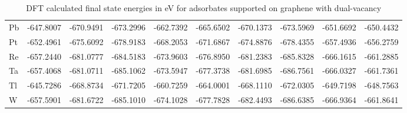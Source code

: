 \begin{table}[h]
{\begin{tabular}{*{10}{l}}
    Pb & -647.8007 & -670.9491 & -673.2996 & -662.7392 & -665.6502 & -670.1373 & -673.5969 & -651.6692 & -650.4432 \\
    Pt & -652.4961 & -675.6092 & -678.9183 & -668.2053 & -671.6867 & -674.8876 & -678.4355 & -657.4936 & -656.2759 \\
    Re & -657.2440 & -681.0777 & -684.5183 & -673.9603 & -676.8950 & -681.2383 & -685.8328 & -666.1615 & -661.2885 \\
    Ta & -657.4068 & -681.0711 & -685.1062 & -673.5947 & -677.3738 & -681.6985 & -686.7561 & -666.0327 & -661.7361 \\
    Tl & -645.7286 & -668.8734 & -671.7205 & -660.7259 & -664.0001 & -668.1110 & -672.0305 & -649.7198 & -648.7563 \\
    W  & -657.5901 & -681.6722 & -685.1010 & -674.1028 & -677.7828 & -682.4493 & -686.6385 & -666.9364 & -661.8641 \\
    \hline
  \end{tabular}
  }
  \caption{DFT calculated final state energies in eV for adsorbates supported on graphene with dual-vacancy}
  \label{si_table6}
\end{table}


